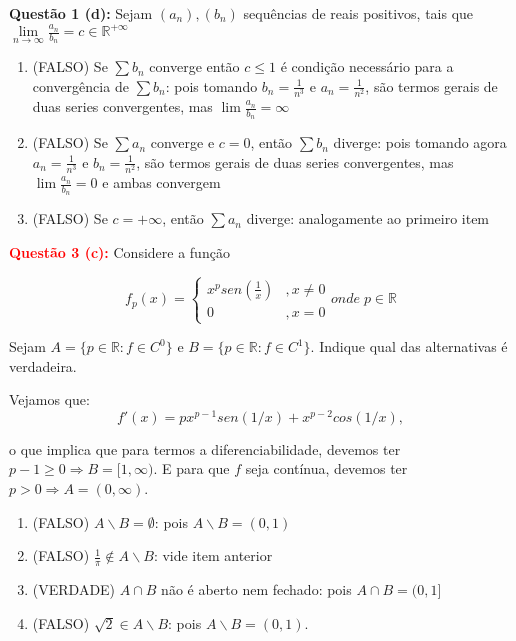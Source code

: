 \documentclass{article}
\begin{document}
\textbf{Questão 1 (d):} Sejam $(a_n), (b_n)$ sequências de reais positivos, tais 
que $\lim \limits_{n \to \infty} \frac{a_n}{b_n} =  c \in \mathbb{R}^{+\infty}$
\begin{enumerate}[label=(\alph*)]
  	\item (FALSO) Se $\sum b_n$ converge então $c \leq 1$ é condição necessário
  para a convergência de $\sum b_n$:
pois tomando $b_n = \frac{1}{n^3}$ e $a_n = \frac{1}{n^2}$, são termos gerais de duas series convergentes, mas $\lim \frac{a_n}{b_n} = \infty$

  	\item (FALSO) Se $\sum a_n$ converge e $c = 0$, então $\sum b_n$ diverge:
  pois tomando agora $a_n = \frac{1}{n^3}$ e $b_n = \frac{1}{n^2}$, são termos gerais de duas series convergentes, mas $\lim \frac{a_n}{b_n} = 0$ e ambas convergem

	\item (FALSO) Se $c = +\infty$, então $\sum a_n$ diverge: analogamente ao
  primeiro item

\end{enumerate}


\textcolor{red}{\textbf{Questão 3 (c):}} Considere a função 

$$ f_p(x)= 
\left\{
\begin{array}{cc}
      x^p sen(\frac{1}{x}) & , x\neq 0 \\
      0 & , x =0
\end{array} 
\right.
onde \; p \in \mathbb{R}
$$

Sejam $A = \{p \in \mathbb{R}: f \in C^0\}$ e $B = \{p \in \mathbb{R}: f \in
C^1\}$. Indique qual das alternativas é verdadeira.

Vejamos que:
$$f'(x) = px^{p-1}sen(1/x) + x^{p-2}cos(1/x),$$

o que implica que para termos a diferenciabilidade, devemos ter $p-1 \geq 0
\Rightarrow B = [1, \infty)$. E para que $f$ seja contínua, devemos ter $ p > 0
\Rightarrow A = (0, \infty)$.

\begin{enumerate}[label=(\alph*)]
  \item (FALSO) $A \backslash B = \emptyset $: pois $A \backslash B = (0,1)$
  
  \item (FALSO) $\frac{1}{\pi} \notin A \backslash B$: vide item anterior
  
  \item (VERDADE) $A \cap B$ não é aberto nem fechado: pois $A \cap B = (0,1]$
  
  \item (FALSO) $\sqrt{2} \in A \backslash B$: pois $A \backslash B = (0,1)$.
\end{enumerate}
\end{document}

